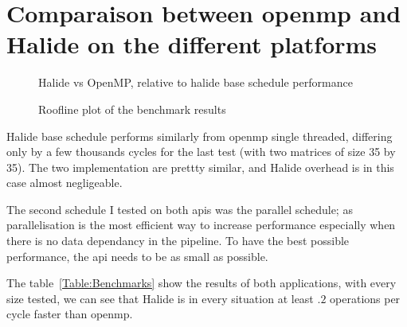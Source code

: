 \section{Comparaison between \gls{openmp} and Halide on the different platforms}

\begin{figure}
	    \captionsetup{skip=1cm}
        
    \caption{Halide vs OpenMP, relative to halide base schedule performance}
	\label{fig:barPlot}
\end{figure}




\begin{figure}[H]
	
    \caption{Roofline plot of the benchmark results}
	\label{fig:roofline}
\end{figure}


	Halide base schedule performs similarly from \gls{openmp} single threaded, differing only by a few thousands cycles for the last test (with two matrices of size 35 by 35).
	The two implementation are prettty similar, and Halide overhead is in this case almost negligeable.

	The second schedule I tested on both \glspl{api} was the parallel schedule; as parallelisation is the most efficient way to increase performance especially when there is no data dependancy in the pipeline. To have the best possible performance, the \gls{api} needs to be as small as possible.

	The table~\ref{Table:Benchmarks} show the results of both applications, with every size tested, we can see that Halide is in every situation at least $.2$ operations per cycle faster than \gls{openmp}.




